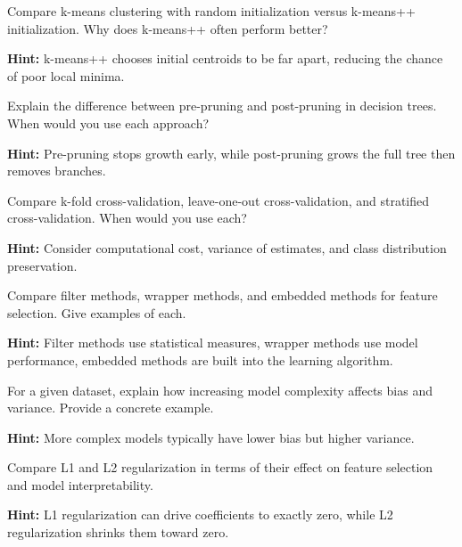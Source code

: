 \begin{problem}
\label{prob:kmeans-init}
Compare k-means clustering with random initialization versus k-means++ initialization. Why does k-means++ often perform better?

\textbf{Hint:} k-means++ chooses initial centroids to be far apart, reducing the chance of poor local minima.
\end{problem}

\begin{problem}
\label{prob:tree-pruning}
Explain the difference between pre-pruning and post-pruning in decision trees. When would you use each approach?

\textbf{Hint:} Pre-pruning stops growth early, while post-pruning grows the full tree then removes branches.
\end{problem}

\begin{problem}
\label{prob:cross-validation}
Compare k-fold cross-validation, leave-one-out cross-validation, and stratified cross-validation. When would you use each?

\textbf{Hint:} Consider computational cost, variance of estimates, and class distribution preservation.
\end{problem}

\begin{problem}
\label{prob:feature-selection}
Compare filter methods, wrapper methods, and embedded methods for feature selection. Give examples of each.

\textbf{Hint:} Filter methods use statistical measures, wrapper methods use model performance, embedded methods are built into the learning algorithm.
\end{problem}

\begin{problem}
\label{prob:bias-variance}
For a given dataset, explain how increasing model complexity affects bias and variance. Provide a concrete example.

\textbf{Hint:} More complex models typically have lower bias but higher variance.
\end{problem}

\begin{problem}
\label{prob:regularization-effects}
Compare L1 and L2 regularization in terms of their effect on feature selection and model interpretability.

\textbf{Hint:} L1 regularization can drive coefficients to exactly zero, while L2 regularization shrinks them toward zero.
\end{problem}
